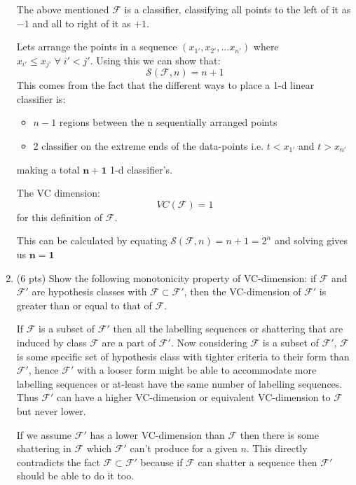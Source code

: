 \documentclass[a4paper]{article}
\theoremstyle{definition}
\newenvironment{soln}{
    \leavevmode\color{blue}\ignorespaces
}{}
\begin{document}
\begin{enumerate}
\begin{soln}
    The above mentioned $\mathcal F$ is a classifier, classifying all points to the left of it as $-1$ and all to right of it as $+1$.
    
    Lets arrange the points in a sequence $(x_{1'},x_{2'},...x_{n'})$ where $x_{i'}\leq x_{j'}\;\forall\;i'<j'$. Using this we can show that:
    $$\mathcal S(\mathcal F,n)=n+1$$
    This comes from the fact that the different ways to place a 1-d linear classifier is:
    \begin{itemize}
        \item $n-1$ regions between the n sequentially arranged points
        \item 2 classifier on the extreme ends of the data-points i.e. $t<x_{1'}$ and $t>x_{n'}$
    \end{itemize} 
    making a total $\mathbf{n+1}$ 1-d classifier's.

    The VC dimension: $$VC(\mathcal F)=1$$ for this definition of $\mathcal F$.
    
    This can be calculated by equating $\mathcal S(\mathcal F,n)=n+1=2^n$ and solving gives us $\mathbf{n=1}$
\end{soln}
\item (6 pts) Show the following monotonicity property of VC-dimension: if $\mathcal{F}$ and $\mathcal{F}'$ are hypothesis classes with $\mathcal{F} \subset \mathcal{F}'$, then the VC-dimension of $\mathcal{F}'$ is greater than or equal to that of $\mathcal{F}$.

\begin{soln}
    If $\mathcal F$ is a subset of $\mathcal F'$ then all the labelling sequences or shattering that are induced by class $\mathcal{F}$ are a part of $\mathcal{F'}$. Now considering $\mathcal F$ is a subset of $\mathcal F'$, $\mathcal F$ is some specific set of hypothesis class with tighter criteria to their form than $\mathcal F'$, hence $\mathcal F'$ with a looser form might be able to accommodate more labelling sequences or at-least have the same number of labelling sequences. Thus $\mathcal F'$ can have a higher VC-dimension or equivalent VC-dimension to $\mathcal F$ but never lower.

    If we assume $\mathcal F'$ has a lower VC-dimension than $\mathcal F$ then there is some shattering in $\mathcal F$ which $\mathcal F'$ can't produce for a given $n$. This directly contradicts the fact $\mathcal{F} \subset \mathcal{F}'$ because if $\mathcal F$ can shatter a sequence then $\mathcal F'$ should be able to do it too.
\end{soln}
\end{enumerate}
\end{document}
